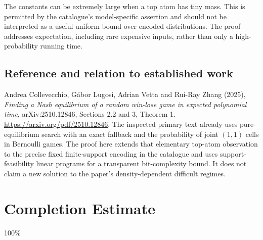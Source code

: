 \documentclass[11pt,a4paper]{article}
\begin{document}
The constants can be extremely large when a top atom has tiny mass. This is permitted by the catalogue's model-specific assertion and should not be interpreted as a useful uniform bound over encoded distributions. The proof addresses expectation, including rare expensive inputs, rather than only a high-probability running time.

\subsection*{Reference and relation to established work}
Andrea Collevecchio, G\'abor Lugosi, Adrian Vetta and Rui-Ray Zhang (2025), \emph{Finding a Nash equilibrium of a random win-lose game in expected polynomial time}, arXiv:2510.12846, Sections 2.2 and 3, Theorem 1. \url{https://arxiv.org/pdf/2510.12846}. The inspected primary text already uses pure-equilibrium search with an exact fallback and the probability of joint $(1,1)$ cells in Bernoulli games. The proof here extends that elementary top-atom observation to the precise fixed finite-support encoding in the catalogue and uses support-feasibility linear programs for a transparent bit-complexity bound. It does not claim a new solution to the paper's density-dependent difficult regimes.

\section{Completion Estimate}
100\%
\end{document}

